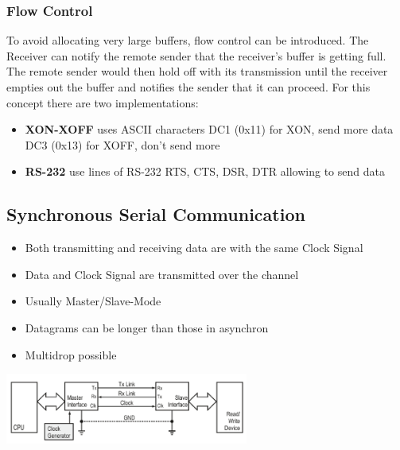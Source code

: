\subsubsection{Flow Control}
To avoid allocating very large buffers, flow control can be introduced.
The Receiver can notify the remote sender that the receiver's buffer is getting full.
The remote sender would then hold off with its transmission until the receiver empties out the buffer and notifies the sender that it can proceed.
For this concept there are two implementations:
\begin{itemize}
	\item \textbf{XON-XOFF} uses \acs{ASCII} characters
	\subitem DC1 (0x11) for XON, send more data
	\subitem DC3 (0x13) for XOFF, don't send more
	\item \textbf{RS-232} use lines of RS-232
	\subitem \acs{RTS}, \acs{CTS}, \acs{DSR}, \acs{DTR} allowing to send data
\end{itemize}
\subsection{Synchronous Serial Communication }
\begin{minipage}{11cm}
	\begin{itemize}
		\item Both transmitting and receiving data are with the same Clock Signal
		\item Data and Clock Signal are transmitted over the channel
		\item Usually Master/Slave-Mode
		\item Datagrams can be longer than those in asynchron
		\item Multidrop possible
	\end{itemize}
\end{minipage}
\begin{minipage}{8cm}
	\includegraphics[width=8cm]{images/syn.png}
\end{minipage}
